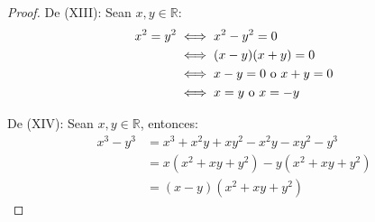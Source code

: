 \documentclass[12pt]{article}
\begin{document}
\begin{enumerate}
\begin{proof}
        De (XIII): Sean $x,y\in\mathbb{R}$:
        \begin{equation*}
            \begin{split}
                x^2=y^2&\iff x^2-y^2=0\\
                &\iff (x-y)(x+y) = 0\\
                &\iff x-y=0 \textup{ o } x+y=0\\
                &\iff x=y \textup{ o } x=-y
            \end{split}
        \end{equation*}

        De (XIV): Sean $x,y\in\mathbb{R}$, entonces:
        \begin{equation*}
            \begin{split}
                x^3-y^3&=x^3+x^2y+xy^2-x^2y-xy^2-y^3\\
                &=x(x^2+xy+y^2)-y(x^2+xy+y^2)\\
                &=(x-y)(x^2+xy+y^2)
            \end{split}
        \end{equation*}


\end{proof}
\end{enumerate}
\end{document}
